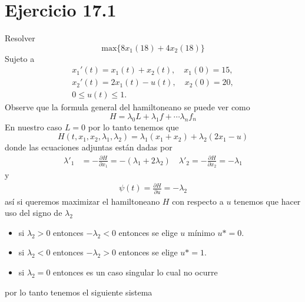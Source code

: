\documentclass{uofa-eng-assignment}
\newcommand{\la}{\lambda}
\begin{document}
\maketitle
\section*{Ejercicio 17.1}
    Resolver
    \[
    \text{max} \{8x_1(18)+4x_2 (18)\}
    \]
    Sujeto a 
    \begin{align*}
        x_1'(t) =x_1(t)+x_2(t) , \quad x_1(0) = 15, \\
        x_2'(t) = 2 x_1(t)- u(t), \quad x_2(0)= 20, \\
        0 \leq u(t) \leq 1.
    \end{align*}
    Observe que la formula general del hamiltoneano se puede ver como 
    \[
    H = \lambda_0 L+ \lambda_1 f+ \cdots \lambda_nf_n
    \]
    En nuestro caso $L = 0$ por lo tanto tenemos que 
    \[
    H(t,x_1,x_2,\lambda_1,\lambda_2) = \lambda_1 (x_1 + x_2) + \lambda_2 (2x_1 - u)
    \]
    donde las ecuaciones adjuntas están dadas por 
    \begin{align*}
        \lambda'_1 &= - \frac{\partial H}{\partial x_1} = -(\lambda_1+2 \la_2) \quad \lambda'_2 = -\frac{\partial H}{\partial x_2} = -\la_1
    \end{align*}
    y
    \begin{align*}
        \psi (t) = \frac{\partial H}{\partial u} = -\lambda_2
    \end{align*}
    así si queremos maximizar el hamiltoneano $H$ con respecto a $u$ tenemos que hacer uso del signo de $\la_2$
    \begin{itemize}
        \item si $ \la_2 > 0$ entonces $-\la_2 <0$ entonces se elige $u$ mínimo $u*= 0$.
        \item si $\la_2 <0$ entonces $- \la_2 >0$ entonces se elige $u*=1$. 
        \item si $\la_2= 0$ entonces es un caso singular lo cual no ocurre
    \end{itemize}
    por lo tanto tenemos el siguiente sistema
\end{document}
